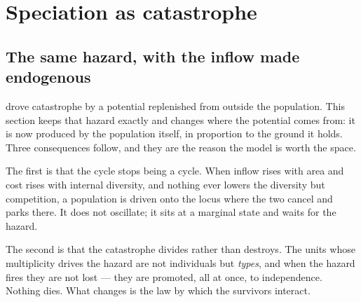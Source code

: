
\section{Speciation as catastrophe}
\label{var:sec:ca}

\subsection{The same hazard, with the inflow made endogenous}
\label{var:sec:camotivation}

 drove catastrophe by a potential replenished from outside
the population. This section keeps that hazard exactly and changes where the
potential comes from: it is now produced by the population itself, in
proportion to the ground it holds. Three consequences follow, and they are
the reason the model is worth the space.

The first is that the cycle stops being a cycle. When inflow rises with area
and cost rises with internal diversity, and nothing ever lowers the
diversity but competition, a population is driven onto the locus where the
two cancel and parks there. It does not oscillate; it sits at a marginal
state and waits for the hazard.

The second is that the catastrophe divides rather than destroys. The units
whose multiplicity drives the hazard are not individuals but \emph{types},
and when the hazard fires they are not lost --- they are promoted, all at
once, to independence. Nothing dies. What changes is the law by which the
survivors interact.

